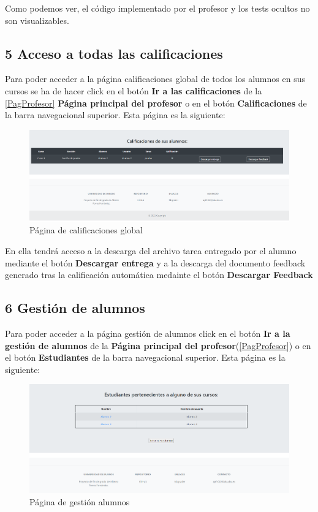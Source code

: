 Como podemos ver, el código implementado por el profesor y los tests ocultos no son visualizables.



\subsection{5 Acceso a todas las calificaciones}
Para poder acceder a la página calificaciones global de todos los alumnos en sus cursos se ha de hacer click en el botón \textbf{Ir a las calificaciones} de la \ref{PagProfesor} \textbf{Página principal del profesor} o en el botón \textbf{Calificaciones} de la barra navegacional superior. Esta página es la siguiente:

\begin{figure}[H]
\centering
\includegraphics[width=\textwidth]{img/imgs-memoria/califGlobal.PNG}
\caption{Página de calificaciones global}
\end{figure}

En ella tendrá acceso a la descarga del archivo tarea entregado por el alumno mediante el botón \textbf{Descargar entrega} y a la descarga del documento feedback generado tras la calificación automática medainte el botón \textbf{Descargar Feedback}


\subsection{6 Gestión de alumnos}
Para poder acceder a la página gestión de alumnos click en el botón \textbf{Ir a la gestión de alumnos} de la \textbf{Página principal del profesor}(\ref{PagProfesor}) o en el botón \textbf{Estudiantes} de la barra navegacional superior. Esta página es la siguiente:

\begin{figure}[H]
\centering
\includegraphics[width=\textwidth]{img/imgs-memoria/paginaEstudiantes.PNG}
\caption{Página de gestión alumnos}
\end{figure}


